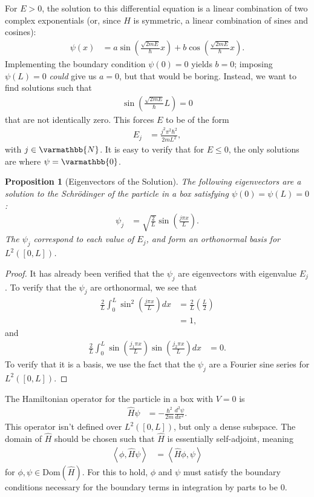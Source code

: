 \documentclass[12pt]{extarticle}
\newcommand{\N}{\varmathbb{N}}
\newcommand{\iprod}[2]{\left\langle #1,#2\right\rangle}
\theoremstyle{plain}
\newtheorem*{proposition}{Proposition}%
\theoremstyle{definition}
\theoremstyle{remark}
\begin{document}
  For $E > 0$, the solution to this differential equation is a linear combination of two complex exponentials (or, since $\hat{H}$ is symmetric, a linear combination of sines and cosines):
  \begin{align*}
    \psi(x) &= a\sin\left(\frac{\sqrt{2mE}}{\hbar}x\right) + b\cos\left(\frac{\sqrt{2mE}}{\hbar}x\right).
  \end{align*}
  Implementing the boundary condition $\psi(0) = 0$ yields $b = 0$; imposing $\psi(L) = 0$ \textit{could} give us $a = 0$, but that would be boring. Instead, we want to find solutions such that
  \begin{align*}
    \sin \left(\frac{\sqrt{2mE}}{\hbar}L\right) = 0
  \end{align*}
  that are not identically zero. This forces $E$ to be of the form
  \begin{align*}
    E_j &= \frac{j^2\pi^2\hbar^2}{2mL^2},
  \end{align*}
  with $j \in \N$. It is easy to verify that for $E \leq 0$, the only solutions are where $\psi = \varmathbb{0}$.
  \begin{proposition}[Eigenvectors of the Solution]
    The following eigenvectors are a solution to the Schrödinger of the particle in a box satisfying $\psi(0) = \psi(L) = 0$:
    \begin{align*}
      \psi_j &= \sqrt{\frac{2}{L}}\sin\left(\frac{j\pi x}{L}\right).
    \end{align*}
    The $\psi_j$ correspond to each value of $E_j$, and form an orthonormal basis for $L^{2}([0,L])$.
  \end{proposition}
  \begin{proof}
    It has already been verified that the $\psi_j$ are eigenvectors with eigenvalue $E_j$. To verify that the $\psi_j$ are orthonormal, we see that
    \begin{align*}
      \frac{2}{L}\int_{0}^{L}\sin^2\left(\frac{j\pi x}{L}\right)dx &= \frac{2}{L}\left(\frac{L}{2}\right)\\
                                                                   &= 1,
    \end{align*}
    and
    \begin{align*}
      \frac{2}{L}\int_{0}^{L}\sin\left(\frac{j_1\pi x}{L}\right) \sin\left(\frac{j_2\pi x}{L}\right) dx &= 0.
    \end{align*}
    To verify that it is a basis, we use the fact that the $\psi_j$ are a Fourier sine series for $L^{2}([0,L])$.
  \end{proof}
  The Hamiltonian operator for the particle in a box with $V = 0$ is
  \begin{align*}
    \hat{H}\psi &= -\frac{\hbar^2}{2m}\frac{d^2\psi}{dx^2}.
  \end{align*}
  This operator isn't defined over $L^{2}([0,L])$, but only a dense subspace. The domain of $\hat{H}$ should be chosen such that $\hat{H}$ is essentially self-adjoint, meaning
  \begin{align*}
    \iprod{\phi}{\hat{H}\psi} &= \iprod{\hat{H}\phi}{\psi}
  \end{align*}
  for $\phi,\psi \in \text{Dom}(\hat{H})$. For this to hold, $\phi$ and $\psi$ must satisfy the boundary conditions necessary for the boundary terms in integration by parts to be $0$.
\end{document}
